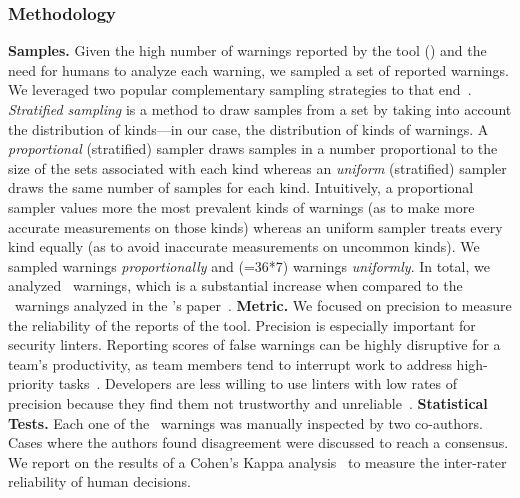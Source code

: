 \subsubsection{Methodology}\label{sec:pre_meth} \textbf{Samples.}
Given the high number of warnings reported by the tool (\minedWarnings) and the need for 
humans to analyze each warning, we sampled a set of reported warnings. 
We leveraged two popular complementary sampling strategies to that end~\cite{strat-sampling}. 
\textit{Stratified sampling} is a method to draw samples from a set by taking into account the 
distribution of kinds---in our case, the distribution of kinds of warnings. A \textit{proportional} (stratified) sampler draws samples in a number proportional to 
the size of the sets associated with each kind whereas an \textit{uniform} (stratified) 
sampler draws the same number of samples for each kind.
Intuitively, 
a proportional sampler values more the most prevalent kinds of warnings (as to make more 
accurate measurements on those kinds) whereas an uniform sampler treats every kind equally 
(as to avoid inaccurate measurements on uncommon kinds).
We sampled \proportionalSampleSize{} warnings \textit{proportionally} and \uniformSampleSize{} 
(=36*7) warnings \textit{uniformly}. In total, we analyzed  
\fpSampleSize\ warnings, which is a substantial increase when compared to the 
\akondFpWarnings\ warnings analyzed in the \slic{}'s paper~\cite{10.1145/3408897}. \textbf{Metric.}
We focused on precision to measure the reliability of the reports of 
the tool. 
Precision is especially important for security linters. Reporting scores of false 
warnings can be highly disruptive for a team's productivity, as team members tend 
to interrupt work to address high-priority tasks~\cite{DistefanoEtAlCACM2019}. Developers 
are less willing to use linters with low rates of precision because they find them not 
trustworthy and unreliable~\cite{46576}. \textbf{Statistical Tests.} Each one of the \fpSampleSize\ warnings was 
manually inspected by two co-authors. Cases where the authors found disagreement were discussed to reach 
a consensus. We report on the results of a Cohen's Kappa
analysis~\cite{cohen1960coefficient} to measure the inter-rater 
reliability of human decisions.
%
